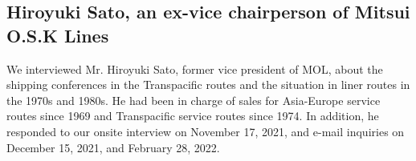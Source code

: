 \documentclass[11pt]{article}
\begin{document}



\subsection{Hiroyuki Sato, an ex-vice chairperson of Mitsui O.S.K Lines}

We interviewed Mr. Hiroyuki Sato, former vice president of MOL, about the shipping conferences in the Transpacific routes and the situation in liner routes in the 1970s and 1980s. He had been in charge of sales for Asia-Europe service routes since 1969 and Transpacific service routes since 1974. In addition, he responded to our onsite interview on November 17, 2021, and e-mail inquiries on December 15, 2021, and February 28, 2022.\\
\end{document}
